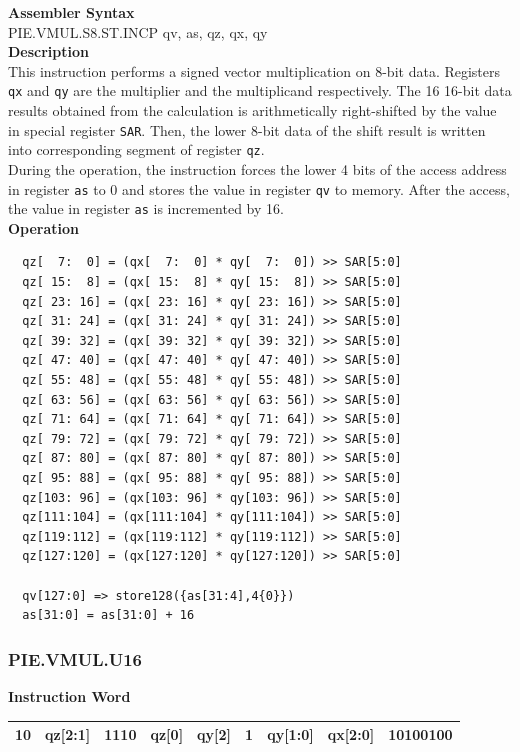 \textbf{Assembler Syntax} \\
PIE.VMUL.S8.ST.INCP qv, as, qz, qx, qy \\
\textbf{Description} \\
This instruction performs a signed vector multiplication on 8-bit data. Registers \lstinline{qx} and \lstinline{qy} are the multiplier and the multiplicand respectively. The 16 16-bit data results obtained from the calculation is arithmetically right-shifted by the value in special register \lstinline{SAR}. Then, the lower 8-bit data of the shift result is written into corresponding segment of register \lstinline{qz}. \\ During the operation, the instruction forces the lower 4 bits of the access address in register \lstinline{as} to 0 and stores the value in register \lstinline{qv} to memory. After the access, the value in register \lstinline{as} is incremented by 16.\\
\textbf{Operation}
\begin{lstlisting}
  qz[  7:  0] = (qx[  7:  0] * qy[  7:  0]) >> SAR[5:0]
  qz[ 15:  8] = (qx[ 15:  8] * qy[ 15:  8]) >> SAR[5:0]
  qz[ 23: 16] = (qx[ 23: 16] * qy[ 23: 16]) >> SAR[5:0]
  qz[ 31: 24] = (qx[ 31: 24] * qy[ 31: 24]) >> SAR[5:0]
  qz[ 39: 32] = (qx[ 39: 32] * qy[ 39: 32]) >> SAR[5:0]
  qz[ 47: 40] = (qx[ 47: 40] * qy[ 47: 40]) >> SAR[5:0]
  qz[ 55: 48] = (qx[ 55: 48] * qy[ 55: 48]) >> SAR[5:0]
  qz[ 63: 56] = (qx[ 63: 56] * qy[ 63: 56]) >> SAR[5:0]
  qz[ 71: 64] = (qx[ 71: 64] * qy[ 71: 64]) >> SAR[5:0]
  qz[ 79: 72] = (qx[ 79: 72] * qy[ 79: 72]) >> SAR[5:0]
  qz[ 87: 80] = (qx[ 87: 80] * qy[ 87: 80]) >> SAR[5:0]
  qz[ 95: 88] = (qx[ 95: 88] * qy[ 95: 88]) >> SAR[5:0]
  qz[103: 96] = (qx[103: 96] * qy[103: 96]) >> SAR[5:0]
  qz[111:104] = (qx[111:104] * qy[111:104]) >> SAR[5:0]
  qz[119:112] = (qx[119:112] * qy[119:112]) >> SAR[5:0]
  qz[127:120] = (qx[127:120] * qy[127:120]) >> SAR[5:0]

  qv[127:0] => store128({as[31:4],4{0}})
  as[31:0] = as[31:0] + 16
\end{lstlisting}

\newpage
\subsubsection{PIE.VMUL.U16}\label{instruction:PIEVMULU16}
\setlength\tabcolsep{6pt}
\textbf{Instruction Word} \\
\begin{tabular}{|c|c|c|c|c|c|c|c|c|}
	\hline
	10 & qz[2:1] & 1110 & qz[0] & qy[2] & 1 & qy[1:0] & qx[2:0] & 10100100 \\
	\hline
\end{tabular}

